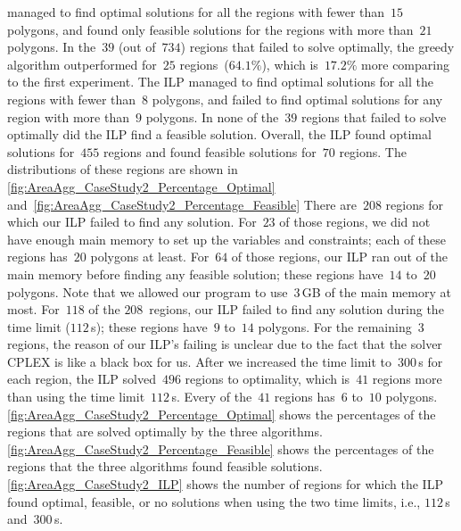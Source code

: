 \documentclass[acmsmall,natbib=false]{acmart}
\begin{document}
\Astar managed to find optimal solutions 
for all the regions with fewer than~$15$ polygons, and 
found only feasible solutions for the regions 
with more than~$21$ polygons.
%
In the~$39$ (out of~$734$) regions 
that \Astar failed to solve optimally,
the greedy algorithm outperformed \Astar 
for~$25$ regions~($64.1\%$), 
which is~$17.2\%$ more comparing to the first experiment.
%
The ILP managed to find optimal solutions 
for all the regions with fewer than~$8$ polygons,
and failed to find optimal solutions
for any region with more than~$9$ polygons.
In none of the~$39$ regions 
that \Astar failed to solve optimally
did the ILP find a feasible solution.
Overall, the ILP found optimal solutions for~$455$ regions
and found feasible solutions for~$70$ regions.
The distributions of these regions are shown in
\figs\ref{fig:AreaAgg_CaseStudy2_Percentage_Optimal}
and~\fig\ref{fig:AreaAgg_CaseStudy2_Percentage_Feasible}
There are~$208$ regions for which 
our ILP failed to find any solution.
For~$23$ of those regions, 
we did not have enough main memory 
to set up the variables and constraints;
each of these regions has~$20$ polygons at least.
For~$64$ of those regions, 
our ILP ran out of the main memory 
before finding any feasible solution;
these regions have~$14$ to~$20$ polygons.
Note that we allowed our program to use~$3\,$GB 
of the main memory at most.
For~$118$ of the $208$~regions, 
our ILP failed to find any solution
during the time limit ($112\,$s);
these regions have~$9$ to~$14$ polygons.
For the remaining~$3$ regions, 
the reason of our ILP's failing is unclear 
due to the fact that 
the solver CPLEX is like a black box for us.
After we increased the time limit to~$300\,$s for each region, 
the ILP solved~$496$ regions to optimality, which 
is~$41$ regions more than using the time limit~$112\,$s.
Every of the~$41$ regions has~$6$ to~$10$ polygons.
\fig\ref{fig:AreaAgg_CaseStudy2_Percentage_Optimal}
shows the percentages of the regions 
that are solved optimally by the three algorithms.
\fig\ref{fig:AreaAgg_CaseStudy2_Percentage_Feasible} 
shows the percentages of the regions 
that the three algorithms found feasible solutions.
\fig\ref{fig:AreaAgg_CaseStudy2_ILP} shows 
the number of regions for which 
the ILP found optimal, feasible, or no solutions 
when using the two time limits, i.e., $112\,$s and~$300\,$s.
\end{document}
